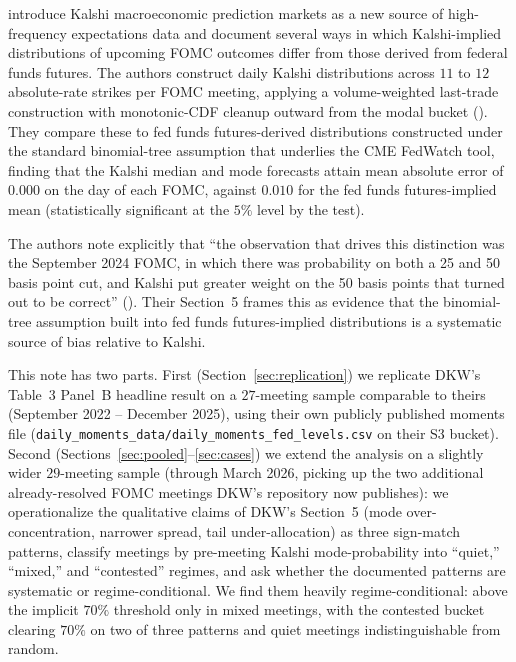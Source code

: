 \documentclass[11pt]{article}
\begin{document}
\citet{dkw2026} introduce Kalshi macroeconomic prediction markets as a
new source of high-frequency expectations data and document several
ways in which Kalshi-implied distributions of upcoming FOMC outcomes
differ from those derived from federal funds futures. The authors
construct daily Kalshi distributions across $11$ to $12$ absolute-rate
strikes per FOMC meeting, applying a volume-weighted last-trade
construction with monotonic-CDF cleanup outward from the modal bucket
(\citealp[\S 3]{dkw2026}). They compare these to fed funds
futures-derived distributions constructed under the standard
binomial-tree assumption that underlies the CME FedWatch tool, finding
\citep[Table~3 Panel~B]{dkw2026} that the Kalshi median and mode
forecasts attain mean absolute error of $0.000$ on the day of each
FOMC, against $0.010$ for the fed funds futures-implied mean
(statistically significant at the $5\%$ level by the
\citealp{diebold-mariano1995} test).

The authors note explicitly that ``the observation that drives this
distinction was the September 2024 FOMC, in which there was probability
on both a 25 and 50 basis point cut, and Kalshi put greater weight on
the 50 basis points that turned out to be correct''
(\citealp[p.~24]{dkw2026}). Their Section~5 frames this as evidence
that the binomial-tree assumption built into fed funds futures-implied
distributions is a systematic source of bias relative to Kalshi.

This note has two parts. First (Section~\ref{sec:replication}) we
replicate DKW's Table~3 Panel~B headline result on a $27$-meeting
sample comparable to theirs (September 2022 -- December 2025), using
their own publicly published moments file
(\texttt{daily\_moments\_data/daily\_moments\_fed\_levels.csv} on
their S3 bucket). Second (Sections~\ref{sec:pooled}--\ref{sec:cases})
we extend the analysis on a slightly wider $29$-meeting sample
(through March 2026, picking up the two additional already-resolved
FOMC meetings DKW's repository now publishes): we operationalize the
qualitative claims of DKW's Section~5 (mode over-concentration,
narrower spread, tail under-allocation) as three sign-match patterns,
classify meetings by pre-meeting Kalshi mode-probability into
``quiet,'' ``mixed,'' and ``contested'' regimes, and ask whether the
documented patterns are systematic or regime-conditional. We find
them heavily regime-conditional: above the implicit $70\%$ threshold
only in mixed meetings, with the contested bucket clearing $70\%$ on
two of three patterns and quiet meetings indistinguishable from
random.
\end{document}
